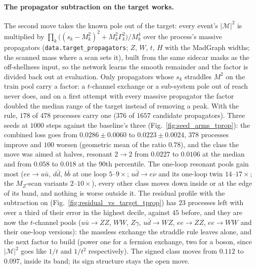 \documentclass[11pt]{article}
\newcommand{\code}[1]{\texttt{#1}}
\begin{document}
\paragraph{The propagator subtraction on the target works.} The second move takes the
known pole out of the target: every event's $|\mathcal M|^2$ is multiplied by
$\prod_k\big((s_k-M_k^2)^2+M_k^2\Gamma_k^2\big)/M_k^4$ over the process's massive propagators
(\code{data.target\_propagators}; $Z$, $W$, $t$, $H$ with the MadGraph widths; the scanned
mass where a scan sets it), built from the same sidecar masks as the off-shellness input,
so the network learns the smooth remainder and the factor is divided back out at
evaluation. Only propagators whose $s_k$ straddles $M^2$ on the train pool carry a factor:
a $t$-channel exchange or a sub-system pole out of reach never does, and on a first
attempt with every massive propagator the factor doubled the median range of the target
instead of removing a peak. With the rule, $178$ of $478$ processes carry one ($376$ of
$1657$ candidate propagators). Three seeds at $1000$ steps against the baseline's three
(Fig.~\ref{fig:seed_arms_tprop}): the combined loss goes from $0.0286\pm0.0060$ to
$0.0223\pm0.0024$, $378$ processes improve and $100$ worsen (geometric mean of the ratio
$0.78$), and the class the move was aimed at halves, resonant $2\to2$ from $0.0227$ to
$0.0106$ at the median and from $0.058$ to $0.018$ at the $90$th percentile. The one-loop
resonant pools gain most ($ee\to u\bar u$, $d\bar d$, $b\bar b$ at one loop $5$--$9\times$;
$u\bar d\to e\nu$ and its one-loop twin $14$--$17\times$; the $M_Z$-scan variants $2$--$10\times$),
every other class moves down inside or at the edge of its band, and nothing is worse
outside it. The residual profile with the subtraction on
(Fig.~\ref{fig:residual_vs_target_tprop}) has $23$ processes left with over a third of their
error in the highest decile, against $45$ before, and they are now the $t$-channel pools
($u\bar u\to ZZ$, $WW$, $Z\gamma$, $u\bar d\to WZ$, $ee\to ZZ$, $ee\to WW$ and their one-loop
versions): the massless exchange the straddle rule leaves alone, and the next factor to
build (power one for a fermion exchange, two for a boson, since $|\mathcal M|^2$ goes like
$1/t$ and $1/t^2$ respectively). The signed class moves from $0.112$ to $0.097$, inside its
band; its sign structure stays the open move.
\end{document}
